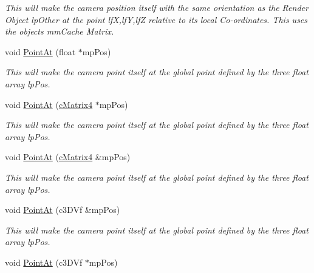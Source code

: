 \begin{DoxyCompactItemize}
\begin{DoxyCompactList}\small\item\em This will make the camera position itself with the same orientation as the Render Object lpOther at the point lfX,lfY,lfZ relative to its local Co-\/ordinates. This uses the objects mmCache Matrix. \end{DoxyCompactList}\item 
\hypertarget{classc_camera_matrix4_aa8ca47d59f6b3b454d700329bdbbdeea}{
void \hyperlink{classc_camera_matrix4_aa8ca47d59f6b3b454d700329bdbbdeea}{PointAt} (float $\ast$mpPos)}
\label{classc_camera_matrix4_aa8ca47d59f6b3b454d700329bdbbdeea}

\begin{DoxyCompactList}\small\item\em This will make the camera point itself at the global point defined by the three float array lpPos. \end{DoxyCompactList}\item 
\hypertarget{classc_camera_matrix4_af4d7a8a24ba247bbd035e22ef609981c}{
void \hyperlink{classc_camera_matrix4_af4d7a8a24ba247bbd035e22ef609981c}{PointAt} (\hyperlink{classc_matrix4}{cMatrix4} $\ast$mpPos)}
\label{classc_camera_matrix4_af4d7a8a24ba247bbd035e22ef609981c}

\begin{DoxyCompactList}\small\item\em This will make the camera point itself at the global point defined by the three float array lpPos. \end{DoxyCompactList}\item 
\hypertarget{classc_camera_matrix4_aa4cd6a1c22791a336c3eb21d0a0d94e4}{
void \hyperlink{classc_camera_matrix4_aa4cd6a1c22791a336c3eb21d0a0d94e4}{PointAt} (\hyperlink{classc_matrix4}{cMatrix4} \&mpPos)}
\label{classc_camera_matrix4_aa4cd6a1c22791a336c3eb21d0a0d94e4}

\begin{DoxyCompactList}\small\item\em This will make the camera point itself at the global point defined by the three float array lpPos. \end{DoxyCompactList}\item 
\hypertarget{classc_camera_matrix4_ac9e73a11692a91065a59af310e8e246b}{
void \hyperlink{classc_camera_matrix4_ac9e73a11692a91065a59af310e8e246b}{PointAt} (c3DVf \&mpPos)}
\label{classc_camera_matrix4_ac9e73a11692a91065a59af310e8e246b}

\begin{DoxyCompactList}\small\item\em This will make the camera point itself at the global point defined by the three float array lpPos. \end{DoxyCompactList}\item 
\hypertarget{classc_camera_matrix4_aee6a49404715d0a891f7e59c0124fc16}{
void \hyperlink{classc_camera_matrix4_aee6a49404715d0a891f7e59c0124fc16}{PointAt} (c3DVf $\ast$mpPos)}
\label{classc_camera_matrix4_aee6a49404715d0a891f7e59c0124fc16}


\end{DoxyCompactItemize}
